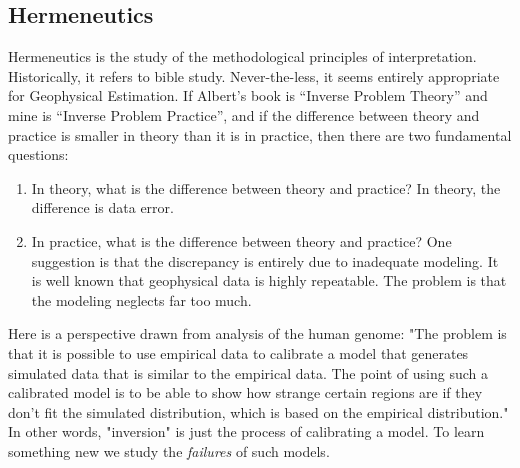 \subsection{Hermeneutics}
Hermeneutics is the
study of the methodological principles of interpretation.
Historically, it refers to bible study.
Never-the-less, it seems entirely appropriate for Geophysical Estimation.
If Albert's book is ``Inverse Problem Theory'' and mine is
``Inverse Problem Practice'', and if
the difference between theory and practice is smaller in theory
than it is in practice,
then there are two fundamental questions:
\begin{enumerate}
\item In theory, what is the difference between theory and practice?
	In theory, the difference is data error.
\item In practice, what is the difference between theory and practice?
	One suggestion is that the discrepancy is entirely due
	to inadequate modeling.
	It is well known that geophysical data is highly repeatable.
	The problem is that the modeling neglects far too much.
\end{enumerate}

\par
Here is a perspective drawn from analysis of the human genome:
"The problem is that
it is possible to use empirical data to calibrate a model
that generates simulated data that
is similar to the empirical data.
The point of using such a calibrated model
is to be able to show how strange certain regions are
if they don't fit the simulated distribution,
which is based on the empirical distribution."
In other words, "inversion" is just the process of calibrating a model.
To learn something new we study the {\it failures} of such models.



\clearpage

